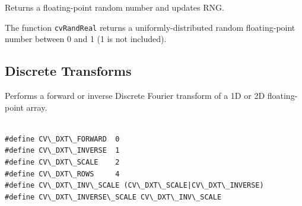 \label{RandReal}

Returns a floating-point random number and updates RNG.


\begin{description}
\end{description}


The function \texttt{cvRandReal} returns a uniformly-distributed random floating-point number between 0 and 1 (1 is not included).

\subsection{Discrete Transforms}

\label{DFT}

Performs a forward or inverse Discrete Fourier transform of a 1D or 2D floating-point array.


\begin{lstlisting}

#define CV\_DXT\_FORWARD  0
#define CV\_DXT\_INVERSE  1
#define CV\_DXT\_SCALE    2
#define CV\_DXT\_ROWS     4
#define CV\_DXT\_INV\_SCALE (CV\_DXT\_SCALE|CV\_DXT\_INVERSE)
#define CV\_DXT\_INVERSE\_SCALE CV\_DXT\_INV\_SCALE

\end{lstlisting}


